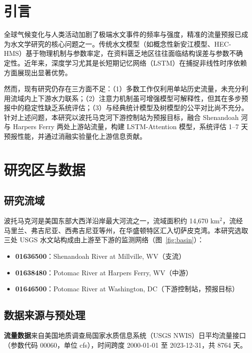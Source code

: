 \documentclass[12pt,a4paper]{article}
\begin{document}
\section{引言}

全球气候变化与人类活动加剧了极端水文事件的频率与强度，精准的流量预报已成为水文学研究的核心问题之一\cite{beven2011}。传统水文模型（如概念性新安江模型、HEC-HMS）基于物理机制与参数率定，在资料匮乏地区往往面临结构误差与参数不确定性\cite{kirchner2006}。近年来，深度学习尤其是长短期记忆网络（LSTM）在捕捉非线性时序依赖方面展现出显著优势\cite{kratzert2019,frame2022}。

然而，现有研究仍存在三方面不足：（1）多数工作仅利用单站历史流量，未充分利用流域内上下游水力联系；（2）注意力机制虽可增强模型可解释性，但其在多步预报中的稳定性缺乏系统评估；（3）与经典统计模型及树模型的公平对比尚不充分。针对上述问题，本研究以波托马克河下游控制站为预报目标，融合 Shenandoah 河与 Harpers Ferry 两处上游站流量，构建 LSTM-Attention 模型，系统评估 1--7 天预报性能，并通过消融实验量化上游信息贡献。

\section{研究区与数据}

\subsection{研究流域}

波托马克河是美国东部大西洋沿岸最大河流之一，流域面积约 14,670 km$^2$，流经马里兰、弗吉尼亚、西弗吉尼亚等州，在华盛顿特区汇入切萨皮克湾。本研究选取三处 USGS 水文站构成由上游至下游的监测网络（图~\ref{fig:basin}）：

\begin{itemize}
  \item \textbf{01636500}：Shenandoah River at Millville, WV（支流）
  \item \textbf{01638480}：Potomac River at Harpers Ferry, WV（中游）
  \item \textbf{01646500}：Potomac River at Washington, DC（下游控制站，预报目标）
\end{itemize}

\subsection{数据来源与预处理}

\textbf{流量数据}来自美国地质调查局国家水质信息系统（USGS NWIS）日平均流量接口（参数代码 00060，单位 cfs），时间跨度 2000-01-01 至 2023-12-31，共 8764 天。
\end{document}

